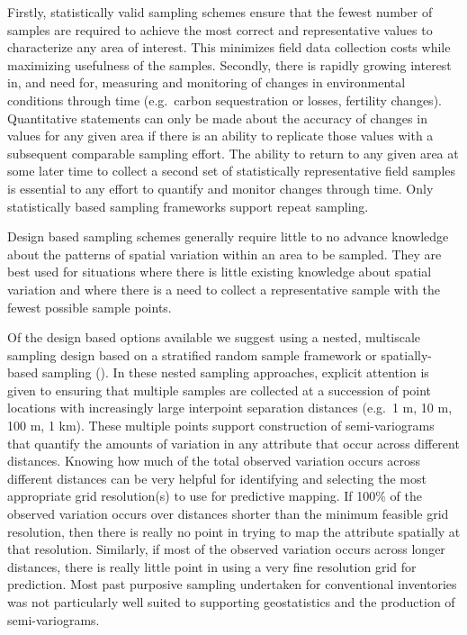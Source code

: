 \documentclass[graybox,natbib,nospthms,UStrade]{svmono}
\begin{document}
Firstly, statistically valid sampling schemes ensure that the fewest
number of samples are required to achieve the most correct and
representative values to characterize any area of interest. This
minimizes field data collection costs while maximizing usefulness of the
samples. Secondly, there is rapidly growing interest in, and need for,
measuring and monitoring of changes in environmental conditions through
time (e.g.~carbon sequestration or losses, fertility changes).
Quantitative statements can only be made about the accuracy of changes
in values for any given area if there is an ability to replicate those
values with a subsequent comparable sampling effort. The ability to
return to any given area at some later time to collect a second set of
statistically representative field samples is essential to any effort to
quantify and monitor changes through time. Only statistically based
sampling frameworks support repeat sampling.

Design based sampling schemes generally require little to no advance
knowledge about the patterns of spatial variation within an area to be
sampled. They are best used for situations where there is little
existing knowledge about spatial variation and where there is a need to
collect a representative sample with the fewest possible sample points.

Of the design based options available we suggest using a nested,
multiscale sampling design based on a stratified random sample
framework or spatially-based sampling (\citet{BrownPES2015}). In these nested
sampling approaches, explicit attention is given to ensuring
that multiple samples are collected at a succession of point locations
with increasingly large interpoint separation distances (e.g.~1 m, 10 m,
100 m, 1 km). These multiple points support construction of
semi-variograms that quantify the amounts of variation in any attribute
that occur across different distances. Knowing how much of the total
observed variation occurs across different distances can be very helpful
for identifying and selecting the most appropriate grid resolution(s) to
use for predictive mapping. If 100\% of the observed variation occurs
over distances shorter than the minimum feasible grid resolution, then
there is really no point in trying to map the attribute spatially at
that resolution. Similarly, if most of the observed variation occurs
across longer distances, there is really little point in using a very
fine resolution grid for prediction. Most past purposive sampling
undertaken for conventional inventories was not particularly well suited
to supporting geostatistics and the production of semi-variograms.
\end{document}
